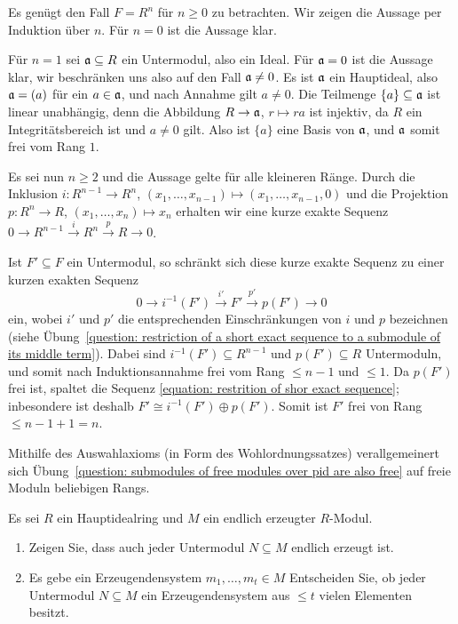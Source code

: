 \begin{solution}
  Es genügt den Fall $F = R^n$ für $n \geq 0$ zu betrachten.
  Wir zeigen die Aussage per Induktion über $n$.
  Für $n = 0$ ist die Aussage klar.
  
  Für $n = 1$ sei $\mathfrak{a} \subseteq R$ ein Untermodul, also ein Ideal.
  Für $\mathfrak{a} = 0$ ist die Aussage klar, wir beschränken uns also auf den Fall $\mathfrak{a} \neq 0$.
  Es ist $\mathfrak{a}$ ein Hauptideal, also $\mathfrak{a} = (a)$ für ein $a \in \mathfrak{a}$, und nach Annahme gilt $a \neq 0$.
  Die Teilmenge $\{a\} \subseteq \mathfrak{a}$ ist linear unabhängig, denn die Abbildung $R \to \mathfrak{a}$, $r \mapsto ra$ ist injektiv, da $R$ ein Integritätsbereich ist und $a \neq 0$ gilt.
  Also ist $\{a\}$ eine Basis von $\mathfrak{a}$, und $\mathfrak{a}$ somit frei vom Rang $1$.
  
  Es sei nun $n \geq 2$ und die Aussage gelte für alle kleineren Ränge.
  Durch die Inklusion $i \colon R^{n-1} \to R^n$, $(x_1, \dotsc, x_{n-1}) \mapsto (x_1, \dotsc, x_{n-1}, 0)$ und die Projektion $p \colon R^n \to R$, $(x_1, \dotsc, x_n) \mapsto x_n$ erhalten wir eine kurze exakte Sequenz $0 \to R^{n-1} \xrightarrow{i} R^n \xrightarrow{p} R \to 0$.
  
  Ist $F' \subseteq F$ ein Untermodul, so schränkt sich diese kurze exakte Sequenz zu einer kurzen exakten Sequenz
  \begin{equation}
    \label{equation: restrition of shor exact sequence}
    0 \to i^{-1}(F') \xrightarrow{i'} F' \xrightarrow{p'} p(F') \to 0
  \end{equation}
  ein, wobei $i'$ und $p'$ die entsprechenden Einschränkungen von $i$ und $p$ bezeichnen (siehe Übung~\ref{question: restriction of a short exact sequence to a submodule of its middle term}).
  Dabei sind $i^{-1}(F') \subseteq R^{n-1}$ und $p(F') \subseteq R$ Untermoduln, und somit nach Induktionsannahme frei vom Rang $\leq n-1$ und $\leq 1$.
  Da $p(F')$ frei ist, spaltet die Sequenz \eqref{equation: restrition of shor exact sequence};
  inbesondere ist deshalb $F' \cong i^{-1}(F') \oplus p(F')$.
  Somit ist $F'$ frei von Rang $\leq n-1 + 1 = n$.
\end{solution}


\begin{remark*}
  Mithilfe des Auswahlaxioms (in Form des Wohlordnungssatzes) verallgemeinert sich Übung~\ref{question: submodules of free modules over pid are also free} auf freie Moduln beliebigen Rangs.
\end{remark*}


\begin{question}[subtitle = Untermoduln endlich erzeugter Moduln über Hauptidealringen]
  Es sei $R$ ein Hauptidealring und $M$ ein endlich erzeugter $R$-Modul.
  \begin{enumerate}
    \item
      Zeigen Sie, dass auch jeder Untermodul $N \subseteq M$ endlich erzeugt ist.
    \item
      Es gebe ein Erzeugendensystem $m_1, \dotsc, m_t \in M$
      Entscheiden Sie, ob jeder Untermodul $N \subseteq M$ ein Erzeugendensystem aus $\leq t$ vielen Elementen besitzt.
  \end{enumerate}
\end{question}


